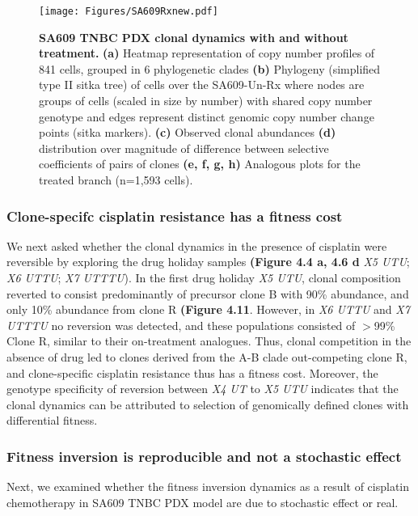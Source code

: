 

\begin{figure}
\centering
\texttt{[image: Figures/SA609Rxnew.pdf]}
	
\caption[SA609 TNBC PDX clonal dynamics with and without treatment.]
	{\small
	\textbf{SA609 TNBC PDX clonal dynamics with and without treatment.}
	    \textbf{(a)} Heatmap representation of copy number profiles of 841 cells, grouped in 6 phylogenetic clades 
	    \textbf{(b)} Phylogeny (simplified type II sitka tree) of cells over the SA609-Un-Rx where nodes are groups of cells (scaled in size by number) with shared copy number genotype and edges represent distinct genomic copy number change points (sitka markers). \textbf{(c)} Observed clonal abundances \textbf{(d)} distribution over magnitude of difference between selective coefficients of pairs of clones \textbf{(e, f, g, h)} Analogous plots for the treated branch (n=1,593 cells).
	}
	\label{fig:Untreated timeseries growth curves only}
\end{figure}



\subsubsection {Clone-specifc cisplatin resistance has a fitness cost}
We next asked whether the clonal dynamics in the presence of cisplatin were reversible by exploring the drug holiday samples \textbf{(Figure 4.4 a, 4.6 d} \textit{X5 UTU}; \textit{X6 UTTU}; \textit{X7 UTTTU}). In the first drug holiday \textit{X5 UTU}, clonal composition reverted to consist predominantly of precursor clone B with 90\% abundance, and only 10\% abundance from clone R \textbf{(Figure 4.11}.  However, in \textit{X6 UTTU} and \textit{X7 UTTTU} no reversion was detected, and these populations consisted of  $>$99\% Clone R, similar to their on-treatment analogues. Thus, clonal competition in the absence of drug led to clones derived from the A-B clade out-competing clone R, and clone-specific cisplatin resistance thus has a fitness cost. Moreover, the genotype specificity of reversion between \textit{X4 UT} to \textit{X5 UTU} indicates that the clonal dynamics can be attributed to selection of genomically defined clones with differential fitness. 


\subsubsection{Fitness inversion is reproducible and not a stochastic effect}
Next, we examined whether the fitness inversion dynamics as a result of cisplatin chemotherapy in SA609 TNBC PDX model are due to stochastic effect or real.

